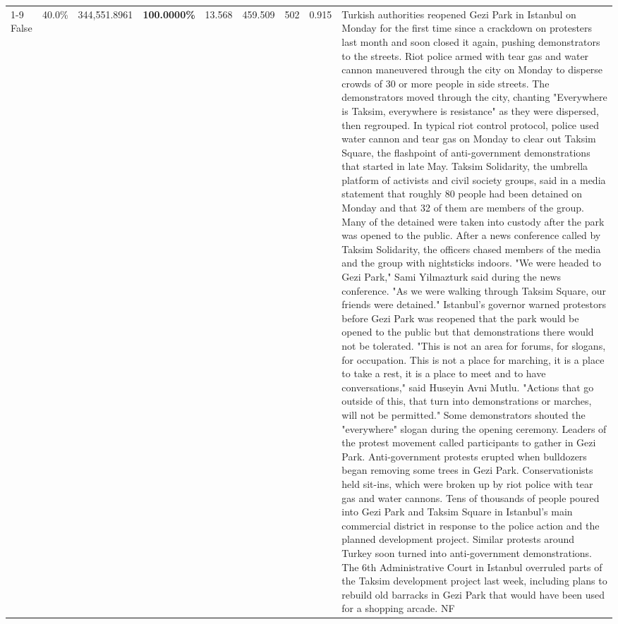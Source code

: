 \begin{table}[H]
\begin{tabular}{lllrlllll}
\cline{1-9}
False & 40.0\% & 344,551.8961 & \bfseries \color{red} 100.0000\% & 13.568 & 459.509 & 502 & 0.915 & Turkish authorities reopened Gezi Park in Istanbul on Monday for the first time since a crackdown on protesters last month and soon closed it again, pushing demonstrators to the streets. Riot police armed with tear gas and water cannon maneuvered through the city on Monday to disperse crowds of 30 or more people in side streets. The demonstrators moved through the city, chanting "Everywhere is Taksim, everywhere is resistance" as they were dispersed, then regrouped. In typical riot control protocol, police used water cannon and tear gas on Monday to clear out Taksim Square, the flashpoint of anti-government demonstrations that started in late May. Taksim Solidarity, the umbrella platform of activists and civil society groups, said in a media statement that roughly 80 people had been detained on Monday and that 32 of them are members of the group. Many of the detained were taken into custody after the park was opened to the public. After a news conference called by Taksim Solidarity, the officers chased members of the media and the group with nightsticks indoors. "We were headed to Gezi Park," Sami Yilmazturk said during the news conference. "As we were walking through Taksim Square, our friends were detained." Istanbul's governor warned protestors before Gezi Park was reopened that the park would be opened to the public but that demonstrations there would not be tolerated. "This is not an area for forums, for slogans, for occupation. This is not a place for marching, it is a place to take a rest, it is a place to meet and to have conversations," said Huseyin Avni Mutlu. "Actions that go outside of this, that turn into demonstrations or marches, will not be permitted." Some demonstrators shouted the "everywhere" slogan during the opening ceremony. Leaders of the protest movement called participants to gather in Gezi Park. Anti-government protests erupted when bulldozers began removing some trees in Gezi Park. Conservationists held sit-ins, which were broken up by riot police with tear gas and water cannons. Tens of thousands of people poured into Gezi Park and Taksim Square in Istanbul's main commercial district in response to the police action and the planned development project. Similar protests around Turkey soon turned into anti-government demonstrations. The 6th Administrative Court in Istanbul overruled parts of the Taksim development project last week, including plans to rebuild old barracks in Gezi Park that would have been used for a shopping arcade. NF \\

\end{tabular}
\end{table}

